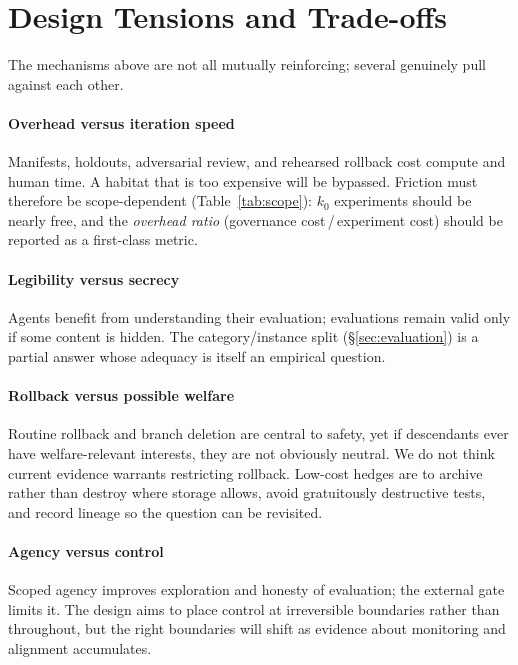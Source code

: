 \documentclass[11pt,a4paper]{article}
\begin{document}
\section{Design Tensions and Trade-offs}\label{sec:tensions}

The mechanisms above are not all mutually reinforcing; several genuinely pull against each other.

\paragraph{Overhead versus iteration speed} Manifests, holdouts, adversarial review, and rehearsed rollback cost compute and human time. A habitat that is too expensive will be bypassed. Friction must therefore be scope-dependent (Table~\ref{tab:scope}): $k_0$ experiments should be nearly free, and the \emph{overhead ratio} (governance cost\,/\,experiment cost) should be reported as a first-class metric.

\paragraph{Legibility versus secrecy} Agents benefit from understanding their evaluation; evaluations remain valid only if some content is hidden. The category/instance split (\S\ref{sec:evaluation}) is a partial answer whose adequacy is itself an empirical question.

\paragraph{Rollback versus possible welfare} Routine rollback and branch deletion are central to safety, yet if descendants ever have welfare-relevant interests, they are not obviously neutral. We do not think current evidence warrants restricting rollback. Low-cost hedges are to archive rather than destroy where storage allows, avoid gratuitously destructive tests, and record lineage so the question can be revisited.

\paragraph{Agency versus control} Scoped agency improves exploration and honesty of evaluation; the external gate limits it. The design aims to place control at irreversible boundaries rather than throughout, but the right boundaries will shift as evidence about monitoring and alignment accumulates.
\end{document}
